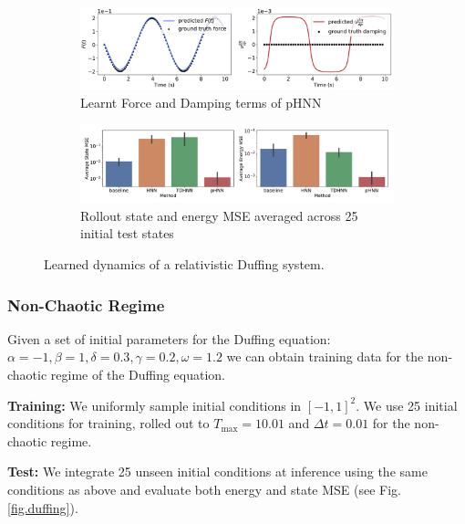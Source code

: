 \documentclass{article}
\begin{document}
\begin{figure}[h!]
\centering
\captionsetup{justification=centering}
	\begin{subfigure}[b]{0.48\textwidth}
		\centering
		\includegraphics[width=\textwidth]{figures/figures/relativity/1/relativity_dpdt_new_0.pdf}
		\caption{Learnt Force and Damping terms of pHNN}
	\end{subfigure}
	\begin{subfigure}[b]{0.48\textwidth}
	    \centering
		\includegraphics[width=\textwidth]{figures/figures/relativity/1/relativity_errors_0.pdf}
		\caption{Rollout state and energy MSE averaged across 25 initial test states}
	\end{subfigure}
\caption{Learned dynamics of a relativistic Duffing system.}
\end{figure}
\subsubsection{Non-Chaotic Regime}

Given a set of initial parameters for the Duffing equation: $\alpha =-1,\beta=1,\delta=0.3,\gamma=0.2,\omega=1.2$ we can obtain training data for the non-chaotic regime of the Duffing equation. 

\textbf{Training:} We uniformly sample initial conditions in $[-1,1]^2$. We use 25 initial conditions for training, rolled out to $T_{\max}=10.01$ and $\Delta t =0.01$ for the non-chaotic regime. 

\textbf{Test:} We integrate 25 unseen initial conditions at inference using the same conditions as above and evaluate both energy and state MSE (see Fig.\ref{fig.duffing}).
\end{document}
